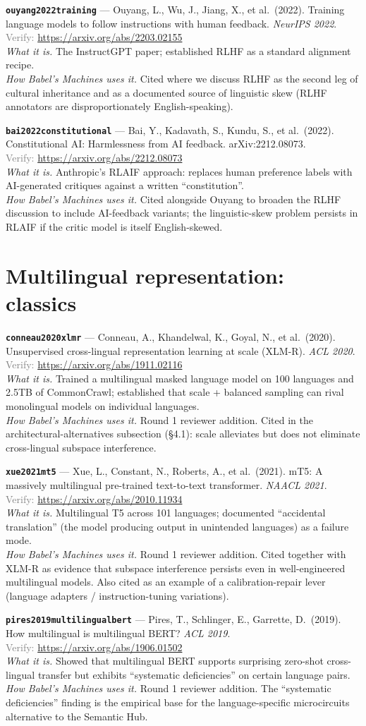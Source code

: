 \documentclass[11pt,a4paper]{article}
\newcommand{\entry}[5]{%
  \par\smallskip
  \noindent\textbf{\texttt{#1}} --- #2\\
  {\footnotesize \textcolor{gray}{Verify:} \url{#3}}\\
  \textit{What it is.} #4\\
  \textit{How Babel's Machines uses it.} #5
  \par\medskip
}
\begin{document}
\entry{ouyang2022training}
{Ouyang, L., Wu, J., Jiang, X., et al.\ (2022). Training language models to follow instructions with human feedback. \emph{NeurIPS 2022}.}
{https://arxiv.org/abs/2203.02155}
{The InstructGPT paper; established RLHF as a standard alignment recipe.}
{Cited where we discuss RLHF as the second leg of cultural inheritance and as a documented source of linguistic skew (RLHF annotators are disproportionately English-speaking).}

\entry{bai2022constitutional}
{Bai, Y., Kadavath, S., Kundu, S., et al.\ (2022). Constitutional AI: Harmlessness from AI feedback. arXiv:2212.08073.}
{https://arxiv.org/abs/2212.08073}
{Anthropic's RLAIF approach: replaces human preference labels with AI-generated critiques against a written ``constitution''.}
{Cited alongside Ouyang to broaden the RLHF discussion to include AI-feedback variants; the linguistic-skew problem persists in RLAIF if the critic model is itself English-skewed.}

\section{Multilingual representation: classics}

\entry{conneau2020xlmr}
{Conneau, A., Khandelwal, K., Goyal, N., et al.\ (2020). Unsupervised cross-lingual representation learning at scale (XLM-R). \emph{ACL 2020}.}
{https://arxiv.org/abs/1911.02116}
{Trained a multilingual masked language model on 100 languages and 2.5TB of CommonCrawl; established that scale + balanced sampling can rival monolingual models on individual languages.}
{Round 1 reviewer addition. Cited in the architectural-alternatives subsection (\S 4.1): scale alleviates but does not eliminate cross-lingual subspace interference.}

\entry{xue2021mt5}
{Xue, L., Constant, N., Roberts, A., et al.\ (2021). mT5: A massively multilingual pre-trained text-to-text transformer. \emph{NAACL 2021}.}
{https://arxiv.org/abs/2010.11934}
{Multilingual T5 across 101 languages; documented ``accidental translation'' (the model producing output in unintended languages) as a failure mode.}
{Round 1 reviewer addition. Cited together with XLM-R as evidence that subspace interference persists even in well-engineered multilingual models. Also cited as an example of a calibration-repair lever (language adapters / instruction-tuning variations).}

\entry{pires2019multilingualbert}
{Pires, T., Schlinger, E., Garrette, D.\ (2019). How multilingual is multilingual BERT? \emph{ACL 2019}.}
{https://arxiv.org/abs/1906.01502}
{Showed that multilingual BERT supports surprising zero-shot cross-lingual transfer but exhibits ``systematic deficiencies'' on certain language pairs.}
{Round 1 reviewer addition. The ``systematic deficiencies'' finding is the empirical base for the language-specific microcircuits alternative to the Semantic Hub.}
\end{document}
